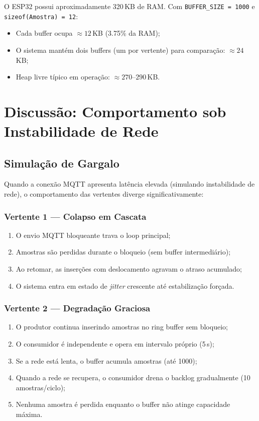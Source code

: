\documentclass[12pt, a4paper]{article}
\begin{document}
O ESP32 possui aproximadamente 320\,KB de RAM. Com \texttt{BUFFER\_SIZE = 1000} e \texttt{sizeof(Amostra) = 12}:

\begin{itemize}
    \item Cada buffer ocupa $\approx 12$\,KB (3.75\% da RAM);
    \item O sistema mantém dois buffers (um por vertente) para comparação: $\approx 24$\,KB;
    \item Heap livre típico em operação: $\approx 270\text{--}290$\,KB.
\end{itemize}

\section{Discussão: Comportamento sob Instabilidade de Rede}

\subsection{Simulação de Gargalo}

Quando a conexão MQTT apresenta latência elevada (simulando instabilidade de rede), o comportamento das vertentes diverge significativamente:

\subsubsection{Vertente 1 --- Colapso em Cascata}

\begin{enumerate}
    \item O envio MQTT bloqueante trava o loop principal;
    \item Amostras são perdidas durante o bloqueio (sem buffer intermediário);
    \item Ao retomar, as inserções com deslocamento agravam o atraso acumulado;
    \item O sistema entra em estado de \textit{jitter} crescente até estabilização forçada.
\end{enumerate}

\subsubsection{Vertente 2 --- Degradação Graciosa}

\begin{enumerate}
    \item O produtor continua inserindo amostras no ring buffer sem bloqueio;
    \item O consumidor é independente e opera em intervalo próprio (5\,s);
    \item Se a rede está lenta, o buffer acumula amostras (até 1000);
    \item Quando a rede se recupera, o consumidor drena o backlog gradualmente (10 amostras/ciclo);
    \item Nenhuma amostra é perdida enquanto o buffer não atinge capacidade máxima.
\end{enumerate}
\end{document}
